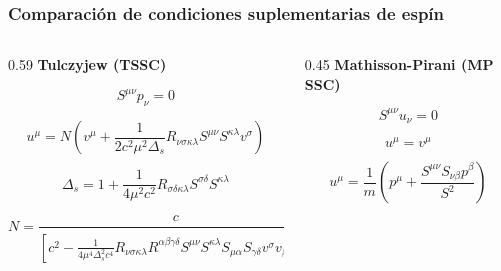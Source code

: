 \documentclass[aspectratio=169,10pt,usenames,dvipsnames,spanish]{beamer}
\begin{document}
\begin{frame}
\frametitle{Comparación de condiciones suplementarias de espín}

\begin{columns}[t]

\begin{column}{0.59\textwidth}
\textbf{Tulczyjew (TSSC)}

\vspace{0.3cm}

\begin{equation}
S^{\mu\nu}p_\nu = 0
\end{equation}

\vspace{0.3cm}


\begin{equation}
u^\mu = N \left(v^\mu + \frac{1}{2c^2\mu^2\Delta_s}
R_{\nu\sigma\kappa\lambda}S^{\mu\nu}S^{\kappa\lambda}v^\sigma \right)
\end{equation}

\vspace{0.3cm}

\begin{equation}
\Delta_s = 1 + \frac{1}{4\mu^2 c^2}
R_{\sigma\delta\kappa\lambda}S^{\sigma\delta}S^{\kappa\lambda}
\end{equation}

\vspace{0.3cm}

\begin{equation}
N = \frac{c}{\left[c^2 - \frac{1}{4\mu^4 \Delta_s^2 c^4}
R_{\nu\sigma\kappa\lambda}R^{\alpha\beta\gamma\delta}
S^{\mu\nu}S^{\kappa\lambda}S_{\mu\alpha}S_{\gamma\delta}
v^\sigma v_\beta \right]^{1/2}}
\end{equation}

\end{column}

\begin{column}{0.45\textwidth}
\textbf{Mathisson-Pirani (MP SSC)}

\vspace{0.3cm}

\begin{equation}
S^{\mu\nu}u_\nu = 0
\end{equation}

\vspace{0.3cm}

\begin{equation}
u^\mu = v^\mu
\end{equation}

\vspace{0.3cm}

\begin{equation}
u^\mu = \frac{1}{m}\left(p^\mu + 
\frac{S^{\mu\nu}S_{\nu\beta}p^\beta}{S^2}\right)
\end{equation}

\end{column}

\end{columns}

\end{frame}
\end{document}
